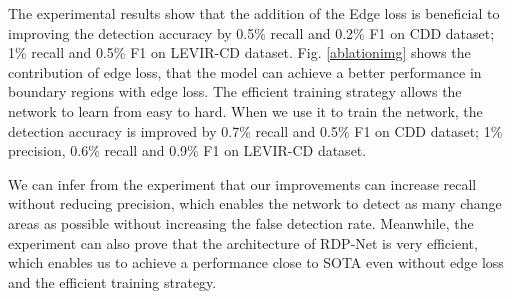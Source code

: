 \documentclass[lettersize,journal]{IEEEtran}
\begin{document}
\begin{figure*}[ht]
\centering
{}

\caption{(a), (b), (h) and (i) are the original input images.
(c) and (j) are the ground truth.
The results of (d) (k) SNUNet-CD with 32 channels,
(e) (l) our RDP-Net without edge loss and efficient training strategy,
(f) (m) our RDP-Net without efficient training strategy.
(g) (n) our RDP-Net.
The false positives and false negatives are indicated by red and green, respectively.
Other colors represent true positives.}
\label{ablationimg}
\end{figure*}

The experimental results show that the addition of the Edge loss is beneficial to improving the detection accuracy by 0.5\% recall and 0.2\% F1 on CDD dataset; 1\% recall and 0.5\% F1 on LEVIR-CD dataset.
Fig. \ref{ablationimg} shows the contribution of edge loss, that the model can achieve a better performance in boundary regions with edge loss.
The efficient training strategy allows the network to learn from easy to hard. When we use it to train the network, the detection accuracy is improved by 0.7\% recall and 0.5\% F1 on CDD dataset; 1\% precision, 0.6\% recall and 0.9\% F1 on LEVIR-CD dataset.

We can infer from the experiment that our improvements can increase recall without reducing precision, which enables the network to detect as many change areas as possible without increasing the false detection rate.
Meanwhile, the experiment can also prove that the architecture of RDP-Net is very efficient, which enables us to achieve a performance close to SOTA even without edge loss and the efficient training strategy.
\end{document}
